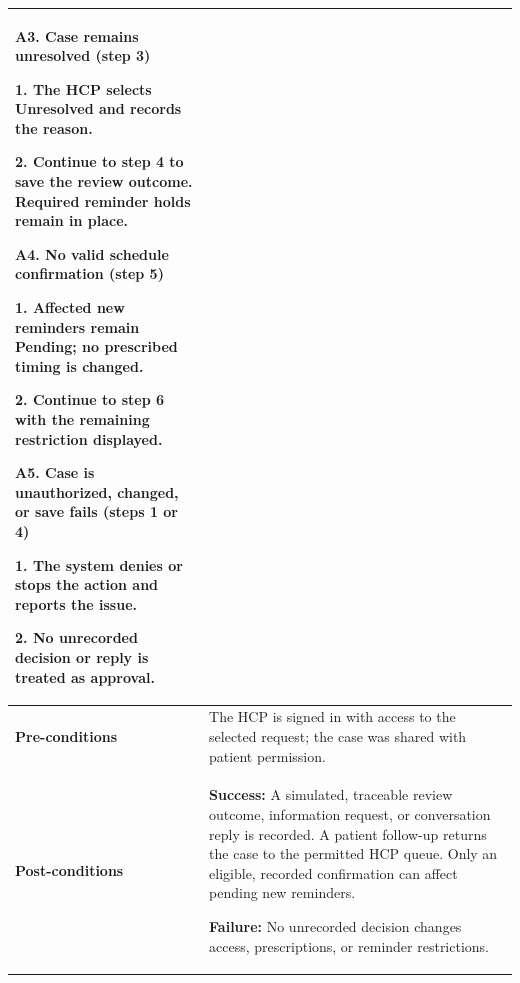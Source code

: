 \begin{longtable}{|p{}|p{}|}
\par\smallskip

\textbf{A3. Case remains unresolved (step 3)}\par
1. The HCP selects Unresolved and records the reason.\par
2. Continue to step 4 to save the review outcome. Required reminder holds remain in place.

\par\smallskip

\textbf{A4. No valid schedule confirmation (step 5)}\par
1. Affected new reminders remain Pending; no prescribed timing is changed.\par
2. Continue to step 6 with the remaining restriction displayed.

\par\smallskip

\textbf{A5. Case is unauthorized, changed, or save fails (steps 1 or 4)}\par
1. The system denies or stops the action and reports the issue.\par
2. No unrecorded decision or reply is treated as approval.
\\ \hline

\textbf{Pre-conditions} &
The HCP is signed in with access to the selected request; the case was shared with patient permission.
\\ \hline

\textbf{Post-conditions} &
\textbf{Success:} A simulated, traceable review outcome, information request, or conversation reply is recorded. A patient follow-up returns the case to the permitted HCP queue. Only an eligible, recorded confirmation can affect pending new reminders.\par
\textbf{Failure:} No unrecorded decision changes access, prescriptions, or reminder restrictions.
\\ \hline

\end{longtable}


\clearpage
